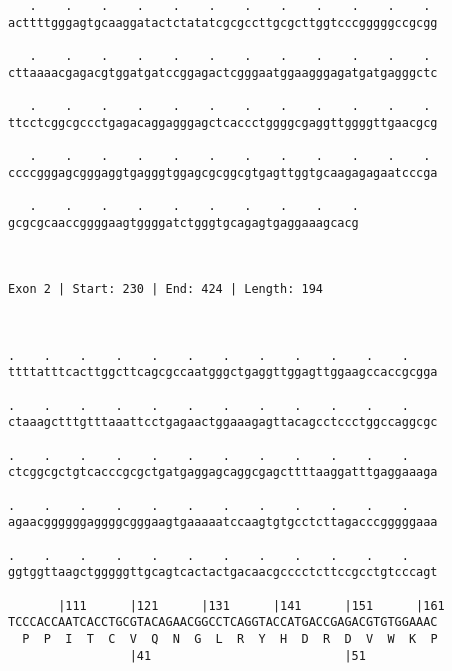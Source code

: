 \documentclass{article}
\begin{document}
\begin{Verbatim}
   .    .    .    .    .    .    .    .    .    .    .    . 
acttttgggagtgcaaggatactctatatcgcgccttgcgcttggtcccgggggccgcgg
                                                            
   .    .    .    .    .    .    .    .    .    .    .    . 
cttaaaacgagacgtggatgatccggagactcgggaatggaagggagatgatgagggctc
                                                            
   .    .    .    .    .    .    .    .    .    .    .    . 
ttcctcggcgccctgagacaggagggagctcaccctggggcgaggttggggttgaacgcg
                                                            
   .    .    .    .    .    .    .    .    .    .    .    . 
ccccgggagcgggaggtgagggtggagcgcggcgtgagttggtgcaagagagaatcccga
                                                            
   .    .    .    .    .    .    .    .    .    .
gcgcgcaaccggggaagtggggatctgggtgcagagtgaggaaagcacg
                                                 
                                                 
 
Exon 2 | Start: 230 | End: 424 | Length: 194



.    .    .    .    .    .    .    .    .    .    .    .    
ttttatttcacttggcttcagcgccaatgggctgaggttggagttggaagccaccgcgga
                                                            
.    .    .    .    .    .    .    .    .    .    .    .    
ctaaagctttgtttaaattcctgagaactggaaagagttacagcctccctggccaggcgc
                                                            
.    .    .    .    .    .    .    .    .    .    .    .    
ctcggcgctgtcacccgcgctgatgaggagcaggcgagcttttaaggatttgaggaaaga
                                                            
.    .    .    .    .    .    .    .    .    .    .    .    
agaacggggggaggggcgggaagtgaaaaatccaagtgtgcctcttagacccgggggaaa
                                                            
.    .    .    .    .    .    .    .    .    .    .    .    
ggtggttaagctgggggttgcagtcactactgacaacgcccctcttccgcctgtcccagt
                                                            
       |111      |121      |131      |141      |151      |161
TCCCACCAATCACCTGCGTACAGAACGGCCTCAGGTACCATGACCGAGACGTGTGGAAAC
  P  P  I  T  C  V  Q  N  G  L  R  Y  H  D  R  D  V  W  K  P
                 |41                           |51          
  

\end{Verbatim}
\end{document}
